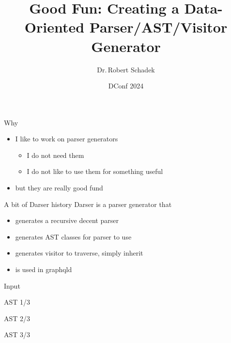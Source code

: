 \documentclass[aspectratio=169,notes]{beamer}
\title{Good Fun: Creating a Data-Oriented Parser/AST/Visitor Generator}
\date{DConf 2024}
\author{Dr.\,Robert Schadek}
\begin{document}
	\maketitle

	\begin{frame}[fragile]{Why}
		\begin{itemize}
			\item I like to work on parser generators
			\pause
			\begin{itemize}
				\item I do not need them
				\item I do not like to use them for something useful
			\end{itemize}
			\item but they are really good fund
		\end{itemize}
	\end{frame}

	\begin{frame}[fragile]{A bit of Darser history}
		Darser is a parser generator that
		\begin{itemize}
			\item generates a recursive decent parser
			\item generates AST classes for parser to use
			\item generates visitor to traverse, simply inherit
			\item is used in graphqld
		\end{itemize}
	\end{frame}

	\begin{frame}[fragile]{Input}
		
	\end{frame}

	\begin{frame}[fragile]{AST 1/3}
		
	\end{frame}

	\begin{frame}[fragile]{AST 2/3}
		
	\end{frame}

	\begin{frame}[fragile]{AST 3/3}
		
	\end{frame}
\end{document}
